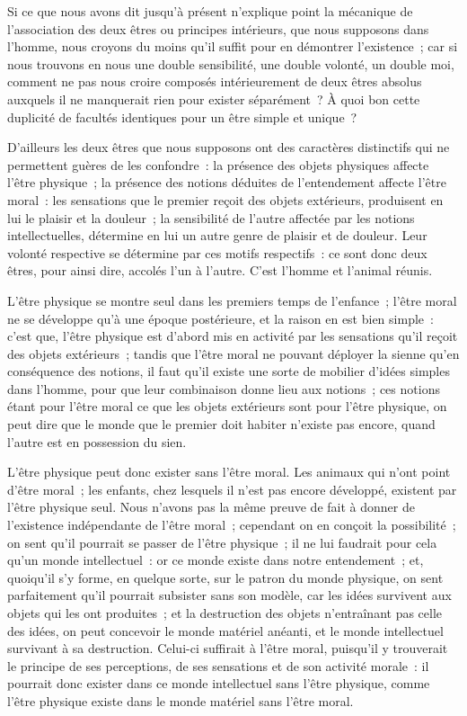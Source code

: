 \documentclass[french,twoside]{book} %
\newcommand\chaptercont{} %
\newcommand\chapterclose{} %
\begin{document}
\chaptercont
\noindent Si ce que nous avons dit jusqu’à présent n’explique point la mécanique de l’association des deux êtres ou principes intérieurs, que nous supposons dans l’homme, nous croyons du moins qu’il suffit pour en démontrer l’existence ; car si nous trouvons en nous une double sensibilité, une double volonté, un double moi, comment ne pas nous croire composés intérieurement de deux êtres absolus auxquels il ne manquerait rien pour exister séparément ? À quoi bon cette duplicité de facultés identiques pour un être simple et unique ?\par
D’ailleurs les deux êtres que nous supposons ont des caractères distinctifs qui ne permettent guères de les confondre : la présence des objets physiques affecte l’être physique ; la présence des notions déduites de l’entendement affecte l’être moral : les sensations que le premier reçoit des objets extérieurs, produisent en lui le plaisir et la douleur ; la sensibilité de l’autre affectée par les notions intellectuelles, détermine en lui un autre genre de plaisir et de douleur. Leur volonté respective se détermine par ces motifs respectifs : ce sont donc deux êtres, pour ainsi dire, accolés l’un à l’autre. C’est l’homme et l’animal réunis.\par
L’être physique se montre seul dans les premiers temps de l’enfance ; l’être moral ne se développe qu’à une époque postérieure, et la raison en est bien simple : c’est que, l’être physique est d’abord mis en activité par les sensations qu’il reçoit des objets extérieurs ; tandis que l’être moral ne pouvant déployer la sienne qu’en conséquence des notions, il faut qu’il existe une sorte de mobilier d’idées simples dans l’homme, pour que leur combinaison donne lieu aux notions ; ces notions étant pour l’être moral ce que les objets extérieurs sont pour l’être physique, on peut dire que le monde que le premier doit habiter n’existe pas encore, quand l’autre est en possession du sien.\par
L’être physique peut donc exister sans l’être moral. Les animaux qui n’ont point d’être moral ; les enfants, chez lesquels il n’est pas encore développé, existent par l’être physique seul. Nous n’avons pas la même preuve de fait à donner de l’existence indépendante de l’être moral ; cependant on en conçoit la possibilité ; on sent qu’il pourrait se passer de l’être physique ; il ne lui faudrait pour cela qu’un monde intellectuel : or ce monde existe dans notre entendement ; et, quoiqu’il s’y forme, en quelque sorte, sur le patron du monde physique, on sent parfaitement qu’il pourrait subsister sans son modèle, car les idées survivent aux objets qui les ont produites ; et la destruction des objets n’entraînant pas celle des idées, on peut concevoir le monde matériel anéanti, et le monde intellectuel survivant à sa destruction. Celui-ci suffirait à l’être moral, puisqu’il y trouverait le principe de ses perceptions, de ses sensations et de son activité morale : il pourrait donc exister dans ce monde intellectuel sans l’être physique, comme l’être physique existe dans le monde matériel sans l’être moral.
\chapterclose
\end{document}
